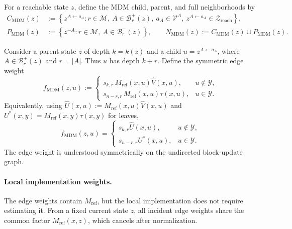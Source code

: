 \documentclass{article}
\numberwithin{theorem}{section}
\numberwithin{proposition}{section}
\numberwithin{corollary}{section}
\numberwithin{lemma}{section}
\numberwithin{conjecture}{section}
\numberwithin{remark}{section}
\numberwithin{definition}{section}
\numberwithin{assumption}{section}
\numberwithin{example}{section}
\newcommand{\calB}{{\mathcal{B}}}
\newcommand{\calM}{{\mathcal{M}}}
\newcommand{\calV}{{\mathcal{V}}}
\newcommand{\calY}{{\mathcal{Y}}}
\newcommand{\calZ}{{\mathcal{Z}}}
\newcommand{\mbra}[1]{\left\{#1\right\}}
\newcommand{\abs}[1]{\left| #1\right|}
\begin{document}
For a reachable state $z$, define the MDM child, parent, and full neighborhoods by
\begin{align*}
    C_{\mathrm{MDM}}(z)&:=\mbra{z^{A\leftarrow a_A}: r\in\calM,\ A\in\calB_r^+(z),\ a_A\in\calV^A,\ z^{A\leftarrow a_A}\in\calZ_{\mathrm{reach}}},\\
    P_{\mathrm{MDM}}(z)&:=\mbra{z^{-A}: r\in\calM,\ A\in\calB_r^-(z)},\qquad
    N_{\mathrm{MDM}}(z):=C_{\mathrm{MDM}}(z)\cup P_{\mathrm{MDM}}(z).
\end{align*}

\begin{definition}
\label{def:balanced_mdm_edge_weights}
Consider a parent state $z$ of depth $k=k(z)$ and a child $u=z^{A\leftarrow a_A}$, where $A\in\calB_r^+(z)$ and $r=\abs{A}$. Thus $u$ has depth $k+r$. Define the symmetric edge weight
\begin{equation*}
    f_{\mathrm{MDM}}(z,u):=
    \begin{cases}
        s_{k,r}\,M_{\mathrm{ref}}(x,u)\widehat V(x,u), & u\notin\calY,\\[1mm]
        s_{n-r,r}\,M_{\mathrm{ref}}(x,u)\tau(x,u), & u\in\calY.
    \end{cases}
\end{equation*}
Equivalently, using $\widehat U(x,u):=M_{\mathrm{ref}}(x,u)\widehat V(x,u)$ and $U^*(x,y)=M_{\mathrm{ref}}(x,y)\tau(x,y)$ for leaves,
\begin{equation*}
    f_{\mathrm{MDM}}(z,u)=
    \begin{cases}
        s_{k,r}\widehat U(x,u), & u\notin\calY,\\
        s_{n-r,r}U^*(x,u), & u\in\calY.
    \end{cases}
\end{equation*}
The edge weight is understood symmetrically on the undirected block-update graph.
\end{definition}

\paragraph{Local implementation weights.}
The edge weights contain $M_{\mathrm{ref}}$, but the local implementation does not require estimating it. From a fixed current state $z$, all incident edge weights share the common factor $M_{\mathrm{ref}}(x,z)$, which cancels after normalization.
\end{document}
